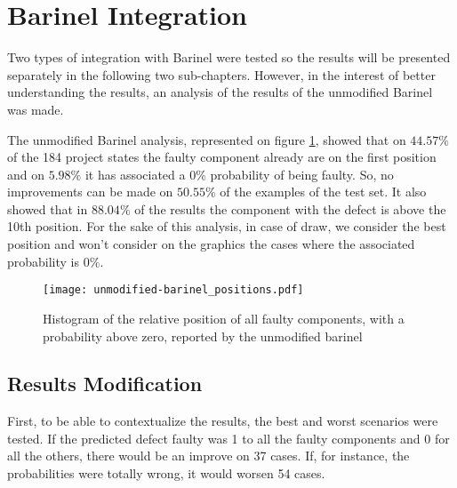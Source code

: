 

\section{Barinel Integration}


Two types of integration with Barinel were tested so the results will be presented separately in the following two sub-chapters. However, in the interest of better understanding the results, an analysis of the results of the unmodified Barinel was made.

The unmodified Barinel analysis, represented on figure \ref{fig:fault-positions}, showed that on $44.57\%$ of the 184 project states the faulty component already are on the first position and on $5.98\%$ it has associated a $0\%$ probability of being faulty. So, no improvements can be made on $50.55\%$ of the examples of the test set. It also showed that in $88.04\%$ of the results the component with the defect is above the 10th position. For the sake of this analysis, in case of draw, we consider the best position and won't consider on the graphics the cases where the associated probability is $0\%$.

\begin{figure}[!]
  \begin{center}
    \leavevmode
    \texttt{[image: unmodified-barinel\_positions.pdf]}
    \caption{Histogram of the relative position of all faulty components, with a probability above zero, reported by the unmodified barinel}
    \label{fig:fault-positions}
  \end{center}
\end{figure}


\subsection{Results Modification}

First, to be able to contextualize the results, the best and worst scenarios were tested. If the predicted defect faulty was 1 to all the faulty components and 0 for all the others, there would be an improve on 37 cases. If, for instance, the probabilities were totally wrong, it would worsen 54 cases.

